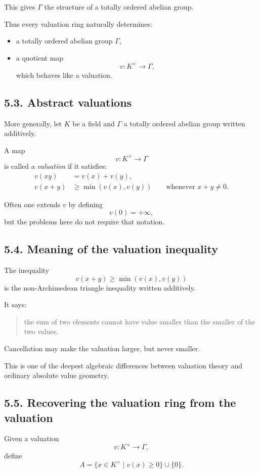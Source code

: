 \documentclass[12pt,a4paper]{article}
\theoremstyle{plain}
\theoremstyle{definition}      %
\begin{document}
This gives \(\Gamma\) the structure of a totally ordered abelian group.

Thus every valuation ring naturally determines:
\begin{itemize}
	\item a totally ordered abelian group \(\Gamma\),
	\item a quotient map
	\[
	v:K^\times\to \Gamma,
	\]
	which behaves like a valuation.
\end{itemize}

\subsection*{5.3. Abstract valuations}

More generally, let \(K\) be a field and \(\Gamma\) a totally ordered abelian group written additively.

A map
\[
v:K^\times\to \Gamma
\]
is called a \emph{valuation} if it satisfies:
\begin{align*}
	v(xy)&=v(x)+v(y),\\
	v(x+y)&\ge \min(v(x),v(y))
	\qquad\text{whenever }x+y\neq 0.
\end{align*}

Often one extends \(v\) by defining
\[
v(0)=+\infty,
\]
but the problems here do not require that notation.

\subsection*{5.4. Meaning of the valuation inequality}

The inequality
\[
v(x+y)\ge \min(v(x),v(y))
\]
is the non-Archimedean triangle inequality written additively.

It says:
\begin{quote}
	the sum of two elements cannot have value smaller than the smaller of the two values.
\end{quote}

Cancellation may make the valuation larger, but never smaller.

This is one of the deepest algebraic differences between valuation theory and ordinary absolute value geometry.

\subsection*{5.5. Recovering the valuation ring from the valuation}

Given a valuation
\[
v:K^\times\to \Gamma,
\]
define
\[
A=\{x\in K^\times\mid v(x)\ge 0\}\cup\{0\}.
\]
\end{document}
